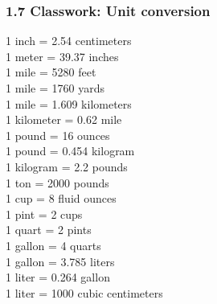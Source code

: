 

\fancyhead[LE]{\thepage}



\subsubsection*{1.7 Classwork: Unit conversion}
\begin{multicols}{3}
  1 inch = 2.54 centimeters\\
  1 meter = 39.37 inches\\
  1 mile = 5280 feet\\
  1 mile = 1760 yards\\
  1 mile = 1.609 kilometers\\
  1 kilometer = 0.62 mile\\
  1 pound = 16 ounces\\
  1 pound = 0.454 kilogram \\
  1 kilogram = 2.2 pounds \\
  1 ton = 2000 pounds\\
  1 cup = 8 fluid ounces \\
  1 pint = 2 cups\\
  1 quart = 2 pints\\
  1 gallon = 4 quarts\\
  1 gallon = 3.785 liters\\
  1 liter = 0.264 gallon\\
  1 liter = 1000 cubic centimeters
\end{multicols}

